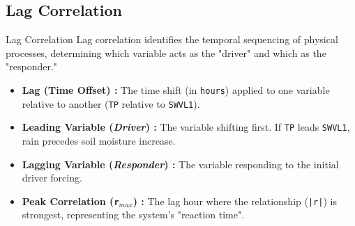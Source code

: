 \documentclass[8pt, aspectratio=169]{beamer}
\begin{document}
\subsection{Lag Correlation}
\begin{frame}{Lag Correlation}
    \vspace{0.2cm}
    Lag correlation identifies the temporal sequencing of physical processes, determining which variable acts as the "driver" and which as the "responder."

    \vspace{0.15cm}
    \footnotesize
    \begin{itemize}
        \item \textbf{Lag (Time Offset) :} The time shift (in \texttt{hours}) applied to one variable relative to another (\texttt{TP} relative to \texttt{SWVL1}).
        \item \textbf{Leading Variable (\textit{Driver}) :} The variable shifting first. If \texttt{TP} leads \texttt{SWVL1}, rain precedes soil moisture increase.
        \item \textbf{Lagging Variable (\textit{Responder}) :} The variable responding to the initial driver forcing.
        \item \textbf{Peak Correlation (\texttt{r$_{max}$}) :} The lag hour where the relationship (\texttt{|r|}) is strongest, representing the system's "reaction time".
    \end{itemize}


\end{frame}
\end{document}
